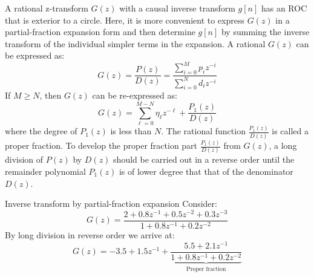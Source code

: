 \documentclass[../../main/main.tex]{subfiles}
\begin{document}
A rational z-transform \( G(z) \) with a causal inverse transform \( g[n] \) has an ROC that is exterior to a circle. Here, it is more convenient to express \( G(z) \) in a partial-fraction expansion form and then determine \( g[n] \) by summing the inverse transform of the individual simpler terms in the expansion. A rational \( G(z) \) can be expressed as:
\begin{equation}
    G(z)
    =
    \frac{P(z)}{D(z)}
    =
    \frac{\displaystyle \sum_{i=0}^{M} p_{i}z^{-i}}{\displaystyle \sum_{i=0}^{N} d_{i}z^{-i}}
    \label{eq:L14_S51_1}
\end{equation}
If \( M \ge N \), then \( G(z) \) can be re-expressed as:
\begin{equation}
    G(z)
    =
    \sum_{\ell=0}^{M-N} \eta_{\ell}z^{-\ell} + \frac{P_{1}(z)}{D(z)}
    \label{eq:L14_S51_2}
\end{equation}
where the degree of \( P_{1}(z) \) is less than \( N \). The rational function \( \frac{P_{1}(z)}{D(z)} \) is called a proper fraction. To develop the proper fraction part \( \frac{P_{1}(z)}{D(z)} \) from \( G(z) \), a long division of \( P(z) \) by \( D(z) \) should be carried out in a reverse order until the remainder polynomial \( P_{1}(z) \) is of lower degree that that of the denominator \( D(z) \).

\begin{example}{Inverse transform by partial-fraction expansion}{}
    Consider:
    \begin{equation}
        G(z)
        =
        \frac{2 + 0.8z^{-1} + 0.5z^{-2} + 0.3z^{-3}}{1 + 0.8z^{-1} + 0.2z^{-2}}
        \label{eq:L14_S53_1}
    \end{equation}
    By long division in reverse order we arrive at:
    \begin{equation}
        G(z)
        =
        -3.5 + 1.5z^{-1} + \underbrace{\frac{5.5 + 2.1z^{-1}}{1 + 0.8z^{-1} + 0.2z^{-2}}}_{\text{Proper fraction}}
        \label{eq:L14_S53_2}
    \end{equation}
\end{example}
\end{document}
